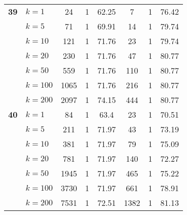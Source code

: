 \begin{table}[htbp]
\begin{tabular}{|l|l|c|c|c|c|c|c|}
    \multicolumn{1}{|r|}{\textbf{39}} & $k=1$ & 24 & 1 & 62.25 & 7 & 1 & 76.42 \\ 
     & $k=5$ & 71 & 1 & 69.91 & 14 & 1 & 79.74 \\ 
     & $k=10$ & 121 & 1 & 71.76 & 23 & 1 & 79.74 \\ 
     & $k=20$ & 230 & 1 & 71.76 & 47 & 1 & 80.77 \\ 
     & $k=50$ & 559 & 1 & 71.76 & 110 & 1 & 80.77 \\ 
     & $k=100$ & 1065 & 1 & 71.76 & 216 & 1 & 80.77 \\ 
     & $k=200$ & 2097 & 1 & 74.15 & 444 & 1 & 80.77 \\ \hline
    \multicolumn{1}{|r|}{\textbf{40}} & $k=1$ & 84 & 1 & 63.4 & 23 & 1 & 70.51 \\ 
     & $k=5$ & 211 & 1 & 71.97 & 43 & 1 & 73.19 \\ 
     & $k=10$ & 381 & 1 & 71.97 & 79 & 1 & 75.09 \\ 
     & $k=20$ & 781 & 1 & 71.97 & 140 & 1 & 72.27 \\ 
     & $k=50$ & 1945 & 1 & 71.97 & 465 & 1 & 75.22 \\ 
     & $k=100$ & 3730 & 1 & 71.97 & 661 & 1 & 78.91 \\ 
     & $k=200$ & 7531 & 1 & 72.51 & 1382 & 1 & 81.13 \\ \hline
    \end{tabular}
\end{table}
